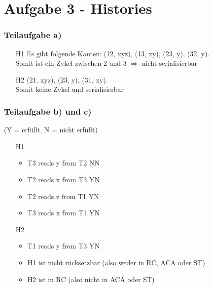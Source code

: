 \documentclass[a4paper,9pt]{scrartcl}
\begin{document}
\section{Aufgabe 3 - Histories}
\subsubsection{Teilaufgabe a)}
\begin{itemize}
\item[H1] Es gibt folgende Kanten:
    (12, xyz), (13, xy), (23, y), (32, y).\\
    Somit ist ein Zykel zwischen 2 und 3 $\Rightarrow$ nicht serialisierbar
\item[H2] (21, xyz), (23, y), (31, xy).\\
    Somit keine Zykel und serialisierbar
\end{itemize}

\subsubsection{Teilaufgabe b) und c)}
(Y = erfüllt, N = nicht erfüllt)
\begin{itemize}
\item[H1]
    \begin{itemize}
        \item T3 reads y from T2 NN
        \item T2 reads x from T3 YN
        \item T2 reads z from T1 YN
        \item T3 reads x from T1 YN
    \end{itemize}
\item[H2]
    \begin{itemize}
        \item T1 reads y from T3 YN
        \item H1 ist nicht rücksetzbar (also weder in RC, ACA oder ST)
        \item H2 ist in RC (also nicht in ACA oder ST)
    \end{itemize}
\end{itemize}
\end{document}
